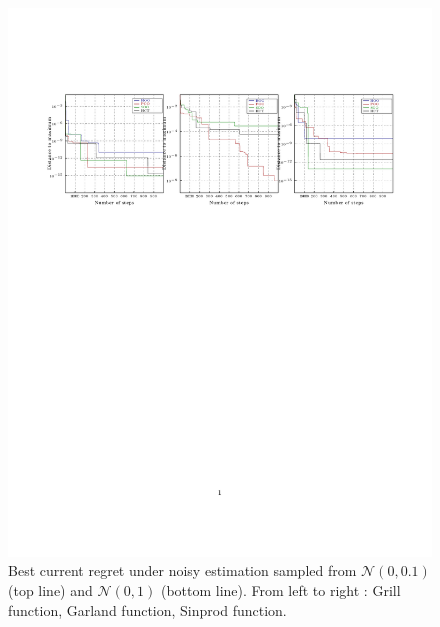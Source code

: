 \documentclass[a4paper,10pt]{article}
\begin{document}
\begin{figure}
\includegraphics[trim={0 6cm 0 4cm},clip]{best1000_1.pdf}
 \caption{Best current regret under noisy estimation sampled from $\mathcal{N}(0,0.1)$ (top line) and $\mathcal{N}(0,1)$ (bottom line). From left to right : Grill function, Garland function, Sinprod function.}
\end{figure}
\end{document}
